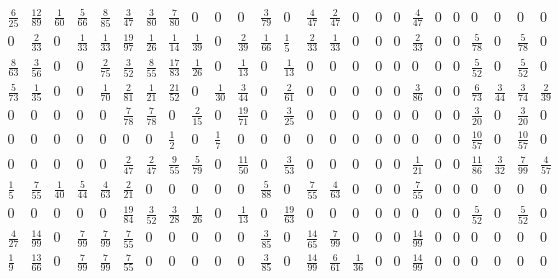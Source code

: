 \documentclass[11pt]{report}
\begin{document}
{\begin{appendices}
\begin{landscape}
\begin{figure} [h!]
\begin{equation*}
\begin{array}{ccccccccccccccccccccccccc}
\frac{6}{25}&\frac{12}{89}&\frac{1}{60}&\frac{5}{66}&\frac{8}{85}&\frac{3}{47}&\frac{3}{80}&\frac{7}{80}&0&0&0&\frac{3}{79}&0&\frac{4}{47}&\frac{2}{47}&0&0&0&\frac{4}{47}&0&0&0&0&0&0\\

0&\frac{2}{33}&0&\frac{1}{33}&\frac{1}{33}&\frac{19}{97}&\frac{1}{26}&\frac{1}{14}&\frac{1}{39}&0&\frac{2}{39}&\frac{1}{66}&\frac{1}{5}&\frac{2}{33}&\frac{1}{33}&0&0&0&\frac{2}{33}&0&0&\frac{5}{78}&0&\frac{5}{78}&0\\

\frac{8}{63}&\frac{3}{56}&0&0&\frac{2}{75}&\frac{3}{52}&\frac{8}{55}&\frac{17}{83}&\frac{1}{26}&0&\frac{1}{13}&0&\frac{1}{13}&0&0&0&0&0&0&0&0&\frac{5}{52}&0&\frac{5}{52}&0\\

\frac{5}{73}&\frac{1}{35}&0&0&\frac{1}{70}&\frac{2}{81}&\frac{1}{21}&\frac{21}{52}&0&\frac{1}{30}&\frac{3}{44}&0&\frac{2}{61}&0&0&0&0&0&\frac{3}{86}&0&0&\frac{6}{73}&\frac{3}{44}&\frac{3}{74}&\frac{2}{39}\\

0&0&0&0&0&\frac{7}{78}&\frac{7}{78}&0&\frac{2}{15}&0&\frac{19}{71}&0&\frac{3}{25}&0&0&0&0&0&0&0&0&\frac{3}{20}&0&\frac{3}{20}&0\\

0&0&0&0&0&0&0&\frac{1}{2}&0&\frac{1}{7}&0&0&0&0&0&0&0&0&0&0&0&\frac{10}{57}&0&\frac{10}{57}&0\\

0&0&0&0&0&\frac{2}{47}&\frac{2}{47}&\frac{9}{55}&\frac{5}{79}&0&\frac{11}{50}&0&\frac{3}{53}&0&0&0&0&0&\frac{1}{21}&0&0&\frac{11}{86}&\frac{3}{32}&\frac{7}{99}&\frac{4}{57}\\

\frac{1}{5}&\frac{7}{55}&\frac{1}{40}&\frac{5}{44}&\frac{4}{63}&\frac{2}{21}&0&0&0&0&0&\frac{5}{88}&0&\frac{7}{55}&\frac{4}{63}&0&0&0&\frac{7}{55}&0&0&0&0&0&0\\

0&0&0&0&0&\frac{19}{84}&\frac{3}{52}&\frac{3}{28}&\frac{1}{26}&0&\frac{1}{13}&0&\frac{19}{63}&0&0&0&0&0&0&0&0&\frac{5}{52}&0&\frac{5}{52}&0\\

\frac{4}{27}&\frac{14}{99}&0&\frac{7}{99}&\frac{7}{99}&\frac{7}{55}&0&0&0&0&0&\frac{3}{85}&0&\frac{14}{65}&\frac{7}{99}&0&0&0&\frac{14}{99}&0&0&0&0&0&0\\

\frac{1}{9}&\frac{13}{66}&0&\frac{7}{99}&\frac{7}{99}&\frac{7}{55}&0&0&0&0&0&\frac{3}{85}&0&\frac{14}{99}&\frac{6}{61}&\frac{1}{36}&0&0&\frac{14}{99}&0&0&0&0&0&0\\


\end{array}
\end{equation*}
\end{figure}
\end{landscape}
\end{appendices}}
\end{document}
